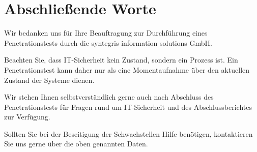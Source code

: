 \chapter{Abschließende Worte}

Wir bedanken uns für Ihre Beauftragung zur Durchführung eines Penetrationstests durch die syntegris information solutions GmbH.

Beachten Sie, dass IT-Sicherheit kein Zustand, sondern ein Prozess ist.
Ein Penetrationstest kann daher nur als eine Momentaufnahme über den aktuellen Zustand der Systeme dienen.


Wir stehen Ihnen selbstverständlich gerne auch nach Abschluss des Penetrationstests für Fragen rund um IT-Sicherheit und des Abschlussberichtes zur Verfügung.

Sollten Sie bei der Beseitigung der Schwachstellen Hilfe benötigen, kontaktieren Sie uns gerne über die oben genannten Daten.
